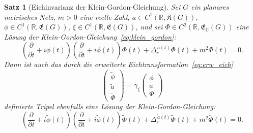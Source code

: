 \documentclass[11pt,a4paper,leqno]{report}
\newtheorem{proposition}{Satz}[chapter]
\numberwithin{equation}{chapter}
\begin{document}
\begin{proposition}[Eichinvarianz der Klein-Gordon-Gleichung]\label{prop:eichinvarianz_kg}
	Sei \(G\) ein planares metrisches Netz, \(m > 0\) eine reelle Zahl, 
	\(a \in C^1(\mathbb{R}, \mathfrak{K}(G))\), 
	\(\phi \in C^1(\mathbb{R}, \mathfrak{E}(G))\), 
	\(\xi \in C^1(\mathbb{R}, \mathfrak{E}(G))\), 
	und sei \(\Phi \in C^2(\mathbb{R}, \mathfrak{E}_\mathbb{C}(G))\) eine Lösung der 
	Klein-Gordon-Gleichung~\eqref{eq:klein_gordon}: 
	\begin{equation}\label{eq:eichinv_ursprung} 
		\left(\frac{\partial}{\partial t} + i\phi(t)\right)
		\left(\frac{\partial}{\partial t} + i\phi(t)\right)\Phi(t)
		+ \Delta_r^{\,a(t)}\Phi(t) + m^2\Phi(t) = 0.
	\end{equation}
	Dann ist auch das durch die erweiterte Eichtransformation~\eqref{eq:erw_eich}
	\begin{equation}\label{eq:eich_transformierte}
		\begin{pmatrix}
			\tilde{\phi} \\[4pt]
			\tilde{a} \\[4pt]
			\tilde{\Phi}
		\end{pmatrix}
		=
		\gamma_\xi
		\begin{pmatrix}
			\phi \\[4pt]
			a \\[4pt]
			\Phi
		\end{pmatrix}
	\end{equation}
	definierte Tripel ebenfalls eine Lösung der Klein-Gordon-Gleichung:
	\begin{equation}\label{eq:eichinv_transformierte}
		\left(\frac{\partial}{\partial t} + i\tilde{\phi}(t)\right)
		\left(\frac{\partial}{\partial t} + i\tilde{\phi}(t)\right)
		\tilde{\Phi}(t)
		+ \Delta_r^{\,\tilde{a}(t)}\tilde{\Phi}(t)
		+ m^2\tilde{\Phi}(t) = 0.
	\end{equation}
\end{proposition}
\end{document}
